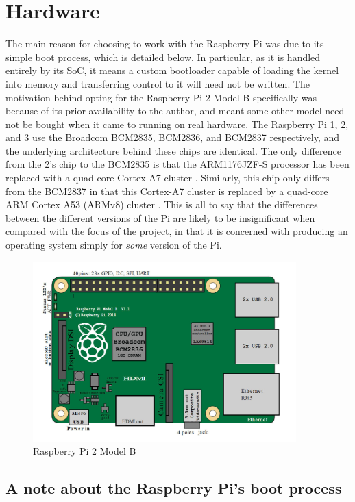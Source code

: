 \documentclass[10pt,a4paper]{article}
\begin{document}
\section*{Hardware}
The main reason for choosing to work with the Raspberry Pi was due to its simple
boot process, which is detailed below. In particular, as it is handled entirely
by its SoC, it means a custom bootloader capable of loading the kernel into
memory and transferring control to it will need not be written. The motivation
behind opting for the Raspberry Pi 2 Model B specifically was because of its
prior availability to the author, and meant some other model need not be bought
when it came to running on real hardware. The Raspberry Pi 1, 2, and 3 use the
Broadcom BCM2835, BCM2836, and BCM2837 respectively, and the underlying
architecture behind these chips are identical. The only difference from the 2's
chip to the BCM2835 is that the ARM1176JZF-S processor has been replaced with a
quad-core Cortex-A7 cluster \cite{BCM2835}. Similarly, this chip only differs
from the BCM2837 in that this Cortex-A7 cluster is replaced by a quad-core ARM
Cortex A53 (ARMv8) cluster \cite{BCM2837}. This is all to say that the
differences between the different versions of the Pi are likely to be
insignificant when compared with the focus of the project, in that it is
concerned with producing an operating system simply for \textit{some} version of
the Pi.

\begin{figure}[h]
    \begin{center}
        \includegraphics[width=4in]{pi-diag.png}
        \caption{Raspberry Pi 2 Model B}
    \end{center}
\end{figure}

\subsection*{A note about the Raspberry Pi's boot process}
\end{document}
